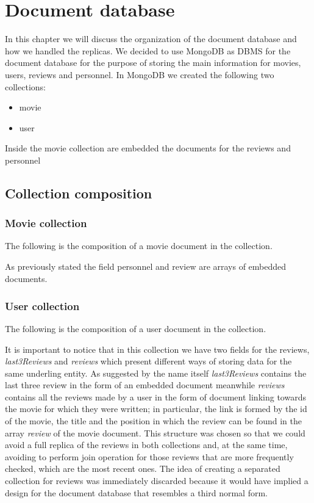 %
%
\chapter{Document database}
\justifying
In this chapter we will discuss the organization of the document database and how we handled the replicas. We decided to use MongoDB as DBMS for the document database for the purpose of storing the main information for movies, users, reviews and personnel. In MongoDB we created the following two collections: 
\begin{itemize}
	\item movie
	\item user
\end{itemize}
Inside the movie collection are embedded the documents for the reviews and personnel
\section{Collection composition}
\subsection{Movie collection}
The following is the composition of a movie document in the collection.


As previously stated the field personnel and review are arrays of embedded documents.

\paragraph{}
\subsection{User collection}
The following is the composition of a user document in the collection.



It is important to notice that in this collection we have two fields for the reviews, \emph{last3Reviews} and \emph{reviews} which present different ways of storing data for the same underling entity. As suggested by the name itself \emph{last3Reviews} contains the last three review in the form of an embedded document meanwhile \emph{reviews} contains all the reviews made by a user in the form of document linking towards the movie for which they were written; in particular, the link is formed by the id of the movie, the title and the position in which the review can be found in the array \emph{review} of the movie document. This structure was chosen so that we could avoid a full replica of the reviews in both collections and, at the same time, avoiding to perform join operation for those reviews that are more frequently checked, which are the most recent ones. The idea of creating a separated collection for reviews was immediately discarded because it would have implied a design for the document database that resembles a third normal form.

